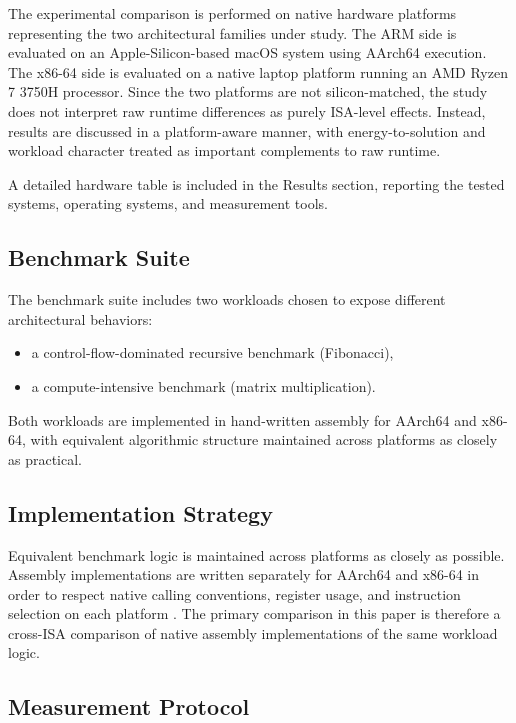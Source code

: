 \documentclass{tcsa}
\begin{document}
The experimental comparison is performed on native hardware platforms representing 
the two architectural families under study. The ARM side is evaluated on an 
Apple-Silicon-based macOS system using AArch64 execution. The x86-64 side is 
evaluated on a native laptop platform running an AMD Ryzen 7 3750H processor. Since 
the two platforms are not silicon-matched, the study does not interpret raw runtime 
differences as purely ISA-level effects. Instead, results are discussed in a 
platform-aware manner, with energy-to-solution and workload character treated as 
important complements to raw runtime.

A detailed hardware table is included in the Results section, reporting the tested 
systems, operating systems, and measurement tools.

\subsection{Benchmark Suite}

The benchmark suite includes two workloads chosen to expose different 
architectural behaviors:

\begin{itemize}
    \item a control-flow-dominated recursive benchmark (Fibonacci),
    \item a compute-intensive benchmark (matrix multiplication).
\end{itemize}

Both workloads are implemented in hand-written assembly for AArch64 and x86-64, 
with equivalent algorithmic structure maintained across platforms as closely as 
practical.

\subsection{Implementation Strategy}

Equivalent benchmark logic is maintained across platforms as closely as possible. 
Assembly implementations are written separately for AArch64 and x86-64 in order to 
respect native calling conventions, register usage, and instruction selection on 
each platform \cite{arm_a_profile_ref_manual,aapcs64,intel_sdm_vol2a_2025}. The primary comparison in this paper is therefore a cross-ISA 
comparison of native assembly implementations of the same workload logic.

\subsection{Measurement Protocol}
\end{document}
